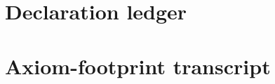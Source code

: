 \documentclass[11pt]{amsart}
\theoremstyle{plain}
\theoremstyle{definition}
\theoremstyle{remark}
\begin{document}





\appendix

\section{Declaration ledger}\label{app:ledger}


\section{Axiom-footprint transcript}\label{app:axioms}



\end{document}
